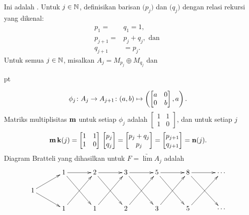 \begin{exam} Ini adalah
. Untuk $j \in \mathbb{N}$, definisikan barisan $\bigl(p_j\bigr)$ dan
$\bigl(q_j\bigr)$ dengan relasi rekursi yang dikenal:
 \begin{align*}
       p_1 = &q_1 = 1, \\
       p_{j+1} = &p_j + q_j, \text{ dan } \\
       q_{j+1} &= p_j.
 \end{align*}
Untuk semua $j \in \mathbb{N}$, misalkan $A_j = M_{p_j} \oplus M_{q_j}$ dan

 pt

 \[\phi_j\colon A_j \rightarrow A_{j+1}\colon (a,b) \mapsto
     \left(\begin{bmatrix} a & 0 \\ 0 & b
          \end{bmatrix},  a \right). \]
Matriks multiplisitas $\mathbf{m}$ untuk setiap $\phi_j$ adalah $\begin{bmatrix} 1 & 1 \\ 1 & 0
\end{bmatrix}$, dan untuk setiap $j$
 \[\mathbf{m}\, \mathbf{k}(j) =
   \begin{bmatrix} 1 & 1 \\ 1 & 0 \end{bmatrix}\,
        \begin{bmatrix} p_j \\ q_j \end{bmatrix} =
   \begin{bmatrix} p_j + q_j \\ p_j \end{bmatrix} =
        \begin{bmatrix} p_{j+1} \\ q_{j+1} \end{bmatrix} =
                          \mathbf{n}(j).\]
Diagram Bratteli yang dihasilkan untuk $F = \underrightarrow{\lim}A_j$ adalah
   \[\xymatrix@-10pt{&& 1 \ar[rr]\ar[rrdd] && 2 \ar[rr]\ar[rrdd] &&
         3 \ar[rr]\ar[rrdd] && 5 \ar[rr]\ar[rrdd] && 8 \ar[rr]\ar[rrdd]&& \cdots\\
              1 \ar[urr]\ar[drr]&&&&&&&&&&  \\
             && 1 \ar[rruu] && 1 \ar[rruu] && 2 \ar[rruu] &&
              3 \ar[rruu] && 5 \ar[rruu]&& \cdots \\
   }\]
\end{exam}













\endinput
